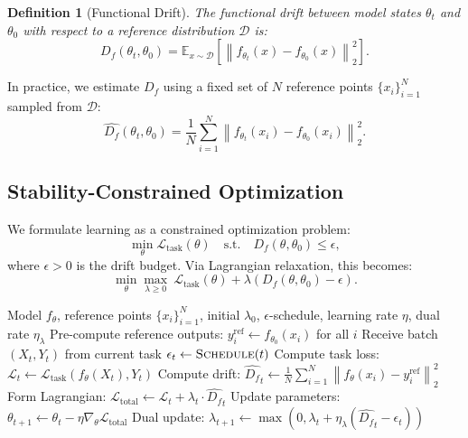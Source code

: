 \documentclass{article}
\newtheorem{definition}{Definition}
\newcommand{\E}{\mathbb{E}}
\newcommand{\norm}[1]{\left\|#1\right\|}
\newcommand{\Df}{D_f}
\newcommand{\calD}{\mathcal{D}}
\newcommand{\calL}{\mathcal{L}}
\begin{document}
\begin{definition}[Functional Drift]
The functional drift between model states $\theta_t$ and $\theta_0$ with respect to a reference distribution $\calD$ is:
\begin{equation}
\Df(\theta_t, \theta_0) = \E_{x \sim \calD}\left[\norm{f_{\theta_t}(x) - f_{\theta_0}(x)}_2^2\right].
\end{equation}
\end{definition}

In practice, we estimate $\Df$ using a fixed set of $N$ reference points $\{x_i\}_{i=1}^N$ sampled from $\calD$:
\begin{equation}
\hat{\Df}(\theta_t, \theta_0) = \frac{1}{N}\sum_{i=1}^N \norm{f_{\theta_t}(x_i) - f_{\theta_0}(x_i)}_2^2.
\end{equation}

\subsection{Stability-Constrained Optimization}

We formulate learning as a constrained optimization problem:
\begin{equation}
\min_\theta \calL_{\text{task}}(\theta) \quad \text{s.t.} \quad \Df(\theta, \theta_0) \leq \epsilon,
\label{eq:constrained}
\end{equation}
where $\epsilon > 0$ is the drift budget. Via Lagrangian relaxation, this becomes:
\begin{equation}
\min_\theta \max_{\lambda \geq 0} \ \calL_{\text{task}}(\theta) + \lambda \left(\Df(\theta, \theta_0) - \epsilon\right).
\end{equation}

\begin{algorithm}[t]
\caption{Functional Trust Region (FTR) Optimization}
\label{alg:ftr}
\begin{algorithmic}[1]
\REQUIRE Model $f_\theta$, reference points $\{x_i\}_{i=1}^N$, initial $\lambda_0$, $\epsilon$-schedule, learning rate $\eta$, dual rate $\eta_\lambda$
\STATE Pre-compute reference outputs: $y_i^{\text{ref}} \gets f_{\theta_0}(x_i)$ for all $i$
    \STATE Receive batch $(X_t, Y_t)$ from current task
    \STATE $\epsilon_t \gets \textsc{Schedule}(t)$ 
    \STATE Compute task loss: $\calL_t \gets \calL_{\text{task}}(f_\theta(X_t), Y_t)$
    \STATE Compute drift: $\hat{\Df}_t \gets \frac{1}{N}\sum_{i=1}^N \norm{f_\theta(x_i) - y_i^{\text{ref}}}_2^2$
    \STATE Form Lagrangian: $\calL_{\text{total}} \gets \calL_t + \lambda_t \cdot \hat{\Df}_t$
    \STATE Update parameters: $\theta_{t+1} \gets \theta_t - \eta \nabla_\theta \calL_{\text{total}}$
    \STATE Dual update: $\lambda_{t+1} \gets \max(0, \lambda_t + \eta_\lambda(\hat{\Df}_t - \epsilon_t))$
\ENDFOR
\end{algorithmic}
\end{algorithm}
\end{document}
